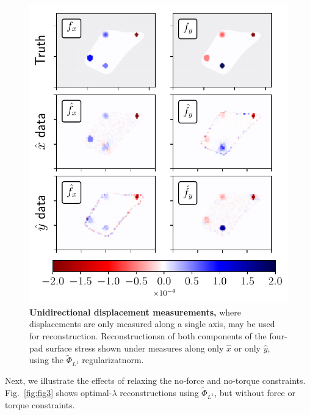 \documentclass[aps,prl,reprint,twocolumn,groupedaddress,showpacs]{revtex4}
\begin{document}
\begin{figure}
\includegraphics[width=\linewidth]{fig5}
\caption{\textbf{Unidirectional displacement measurements,} where displacements
are only measured along a single axis, may be used for reconstruction. Reconstructionsn 
of both components of the four-pad surface stress shown under measures along only $\hat{x}$
or only $\hat{y},$ using the $\tilde{\Phi}_{L^1}$ regularizatnorm.}
\label{XYONLY}
\end{figure}



Next, we illustrate the effects of relaxing the no-force and no-torque
constraints.  Fig.~\ref{fig:fig3} shows optimal-$\lambda$
reconstructions using $\tilde{\Phi}_{L^{1}}$, but without force or
torque constraints.
\end{document}

